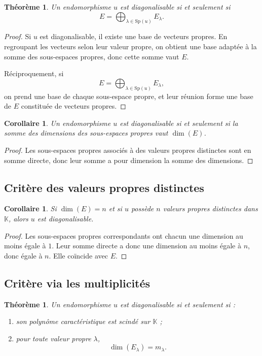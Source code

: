 \documentclass[11pt,a4paper]{article}
\newtheorem{theoreme}[definition]{Théorème}
\newtheorem{corollaire}[definition]{Corollaire}
\theoremstyle{remark}
\newcommand{\K}{\mathbb{K}}
\newcommand{\Sp}{\mathrm{Sp}}
\begin{document}
\begin{theoreme}
Un endomorphisme \(u\) est diagonalisable si et seulement si
\[
E=\bigoplus_{\lambda\in\Sp(u)} E_\lambda.
\]
\end{theoreme}

\begin{proof}
Si \(u\) est diagonalisable, il existe une base de vecteurs propres. En regroupant les vecteurs selon leur valeur propre, on obtient une base adaptée à la somme des sous-espaces propres, donc cette somme vaut \(E\).

Réciproquement, si
\[
E=\bigoplus_{\lambda\in\Sp(u)} E_\lambda,
\]
on prend une base de chaque sous-espace propre, et leur réunion forme une base de \(E\) constituée de vecteurs propres.
\end{proof}

\begin{corollaire}
Un endomorphisme \(u\) est diagonalisable si et seulement si la somme des dimensions des sous-espaces propres vaut \(\dim(E)\).
\end{corollaire}

\begin{proof}
Les sous-espaces propres associés à des valeurs propres distinctes sont en somme directe, donc leur somme a pour dimension la somme des dimensions.
\end{proof}

\subsection{Critère des valeurs propres distinctes}

\begin{corollaire}
Si \(\dim(E)=n\) et si \(u\) possède \(n\) valeurs propres distinctes dans \(\K\), alors \(u\) est diagonalisable.
\end{corollaire}

\begin{proof}
Les sous-espaces propres correspondants ont chacun une dimension au moins égale à \(1\). Leur somme directe a donc une dimension au moins égale à \(n\), donc égale à \(n\). Elle coïncide avec \(E\).
\end{proof}

\subsection{Critère via les multiplicités}

\begin{theoreme}
Un endomorphisme \(u\) est diagonalisable si et seulement si :
\begin{enumerate}[label=\arabic*)]
    \item son polynôme caractéristique est scindé sur \(\K\) ;
    \item pour toute valeur propre \(\lambda\),
    \[
    \dim(E_\lambda)=m_\lambda.
    \]
\end{enumerate}
\end{theoreme}
\end{document}
